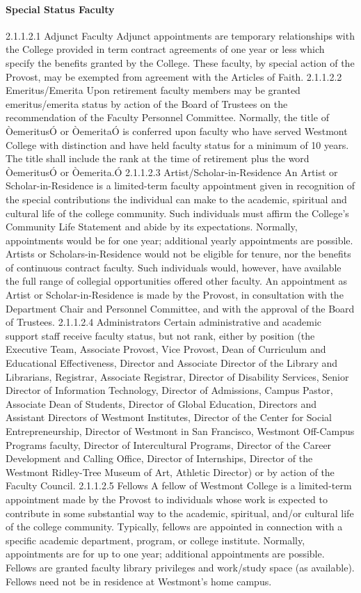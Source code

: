 \documentclass[letterpaper, 11pt]{article}
\begin{document}
			\paragraph{Special Status Faculty}
				2.1.1.2.1 Adjunct Faculty
				Adjunct appointments are temporary relationships with the College provided in term contract agreements of one year or less which specify the benefits granted by the College. These faculty, by special action of the Provost, may be exempted from agreement with the Articles of Faith.
				2.1.1.2.2 Emeritus/Emerita
				Upon retirement faculty members may be granted emeritus/emerita status by action of the Board of Trustees on the recommendation of the Faculty Personnel Committee.  Normally, the title of ÒemeritusÓ or ÒemeritaÓ is conferred upon faculty who have served Westmont College with distinction and have held faculty status for a minimum of 10 years.  The title shall include the rank at the time of retirement plus the word ÒemeritusÓ or Òemerita.Ó
				2.1.1.2.3 Artist/Scholar-in-Residence
				An Artist or Scholar-in-Residence is a limited-term faculty appointment given in recognition of the special contributions the individual can make to the academic, spiritual and cultural life of the college community.  Such individuals must affirm the College's Community Life Statement and abide by its expectations.  Normally, appointments would be for one year; additional yearly appointments are possible.  Artists or Scholars-in-Residence would not be eligible for tenure, nor the benefits of continuous contract faculty. Such individuals would, however, have available the full range of collegial opportunities offered other faculty.  An appointment as Artist or Scholar-in-Residence is made by the Provost, in consultation with the Department Chair and Personnel Committee, and with the approval of the Board of Trustees.
				2.1.1.2.4 Administrators
				Certain administrative and academic support staff receive faculty status, but not rank, either by position (the Executive Team, Associate Provost, Vice Provost, Dean of Curriculum and Educational Effectiveness, Director and Associate Director of the Library and Librarians, Registrar, Associate Registrar, Director of Disability Services, Senior Director of Information Technology, Director of Admissions, Campus Pastor, Associate Dean of Students, Director of Global Education, Directors and Assistant Directors of Westmont Institutes, Director of the Center for Social Entrepreneurship, Director of Westmont in San Francisco, Westmont Off-Campus Programs faculty, Director of Intercultural Programs, Director of the Career Development and Calling Office, Director of Internships, Director of the Westmont Ridley-Tree Museum of Art, Athletic Director) or by action of the Faculty Council.
				2.1.1.2.5 Fellows
				A fellow of Westmont College is a limited-term appointment made by the Provost to individuals whose work is expected to contribute in some substantial way to the academic, spiritual, and/or cultural life of the college community.  Typically, fellows are appointed in connection with a specific academic department, program, or college institute.  Normally, appointments are for up to one year; additional appointments are possible.  Fellows are granted faculty library privileges and work/study space (as available).  Fellows need not be in residence at Westmont's home campus.
\end{document}
